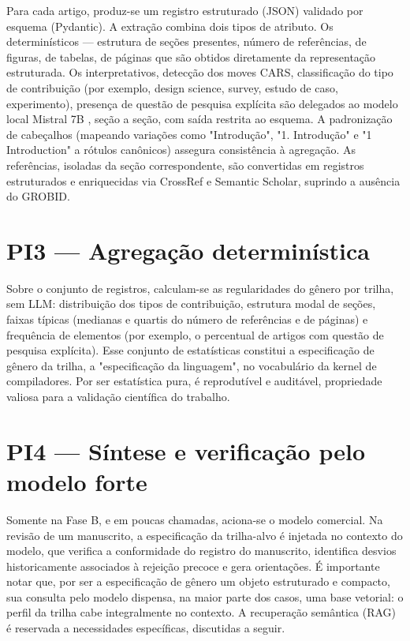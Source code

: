 Para cada artigo, produz-se um registro estruturado (JSON) validado por esquema (Pydantic). A extração combina dois tipos de atributo. Os determinísticos — estrutura de seções presentes, número de referências, de figuras, de tabelas, de páginas que são obtidos diretamente da representação estruturada. Os interpretativos, detecção dos moves CARS, classificação do tipo de contribuição (por exemplo, design science, survey, estudo de caso, experimento), presença de questão de pesquisa explícita  são delegados ao modelo local Mistral 7B \cite{mistral}, seção a seção, com saída restrita ao esquema. A padronização de cabeçalhos (mapeando variações como "Introdução", "1. Introdução" e "1 Introduction" a rótulos canônicos) assegura consistência à agregação. As referências, isoladas da seção correspondente, são convertidas em registros estruturados e enriquecidas via CrossRef e Semantic Scholar, suprindo a ausência do GROBID.

\section{PI3 — Agregação determinística}

Sobre o conjunto de registros, calculam-se as regularidades do gênero por trilha, sem LLM: distribuição dos tipos de contribuição, estrutura modal de seções, faixas típicas (medianas e quartis do número de referências e de páginas) e frequência de elementos (por exemplo, o percentual de artigos com questão de pesquisa explícita). Esse conjunto de estatísticas constitui a especificação de gênero da trilha, a "especificação da linguagem", no vocabulário da kernel de compiladores. Por ser estatística pura, é reprodutível e auditável, propriedade valiosa para a validação científica do trabalho.

\section{PI4 — Síntese e verificação pelo modelo forte}

Somente na Fase B, e em poucas chamadas, aciona-se o modelo comercial. Na revisão de um manuscrito, a especificação da trilha-alvo é injetada no contexto do modelo, que verifica a conformidade do registro do manuscrito, identifica desvios historicamente associados à rejeição precoce e gera orientações. É importante notar que, por ser a especificação de gênero um objeto estruturado e compacto, sua consulta pelo modelo dispensa, na maior parte dos casos, uma base vetorial: o perfil da trilha cabe integralmente no contexto. A recuperação semântica (RAG) é reservada a necessidades específicas, discutidas a seguir.

